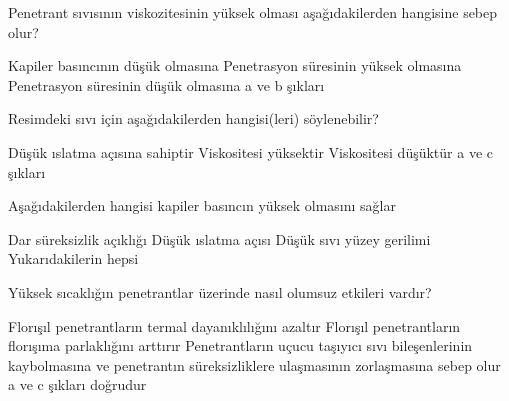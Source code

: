 \begin{question}[subtitle=]
  Penetrant sıvısının viskozitesinin yüksek olması aşağıdakilerden hangisine sebep olur?
	\begin{tasks}
          \task Kapiler basıncının düşük olmasına
          \task Penetrasyon süresinin yüksek olmasına \correct
          \task Penetrasyon süresinin düşük olmasına
          \task a ve b şıkları
	\end{tasks}
\end{question}
\begin{solution}
	\correct
\end{solution}

\begin{question}[subtitle=]
      	\begin{figure}[!htb]
		\centering
		\fbox{\texttt{[image: Capillar]}}
	\end{figure}

  Resimdeki sıvı için aşağıdakilerden hangisi(leri) söylenebilir?
	\begin{tasks}
          \task Düşük ıslatma açısına sahiptir \correct
          \task Viskositesi yüksektir
          \task Viskositesi düşüktür
          \task a ve c şıkları
	\end{tasks}
\end{question}
\begin{solution}
	\correct
\end{solution}

\begin{question}[subtitle=]
  Aşağıdakilerden hangisi kapiler basıncın yüksek olmasını sağlar
	\begin{tasks}
          \task Dar süreksizlik açıklığı
          \task Düşük ıslatma açısı
          \task Düşük sıvı yüzey gerilimi
          \task Yukarıdakilerin hepsi \correct
	\end{tasks}
\end{question}
\begin{solution}
	\correct
\end{solution}

\begin{question}[subtitle=]
  Yüksek sıcaklığın penetrantlar üzerinde nasıl olumsuz etkileri vardır?
	\begin{tasks}
          \task Florışıl penetrantların termal dayanıklılığını azaltır
          \task Florışıl penetrantların florışıma parlaklığını arttırır
          \task Penetrantların uçucu taşıyıcı sıvı bileşenlerinin kaybolmasına ve
          penetrantın süreksizliklere ulaşmasının zorlaşmasına sebep olur
          \task a ve c şıkları doğrudur \correct
	\end{tasks}
\end{question}
\begin{solution}
	\correct
\end{solution}

